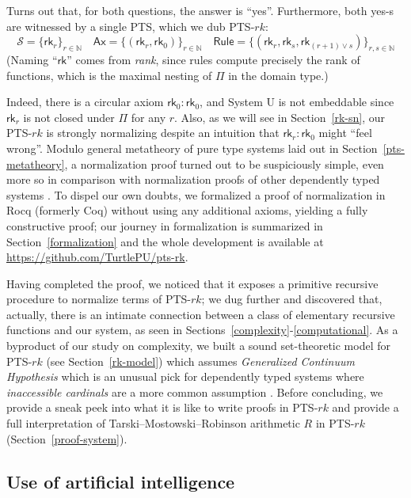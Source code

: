 \documentclass{article}
\theoremstyle{definition}
\theoremstyle{remark}
\begin{document}
Turns out that, for both questions, the answer is
``yes''. Furthermore, both yes-s are witnessed by a
single PTS, which we dub PTS-$rk$:
\[
\mathcal{S}=\{\mathsf{rk}_r\}_{r\in\mathbb{N}}
\quad
\mathsf{Ax}=
    \{(\mathsf{rk}_r,\mathsf{rk}_0)\}_{r\in\mathbb{N}}
\quad
\mathsf{Rule}=
    \{(\mathsf{rk}_r,\mathsf{rk}_s,
        \mathsf{rk}_{(r+1)\vee s})\}_{r,s\in\mathbb{N}}
\]
(Naming ``$\mathsf{rk}$'' comes from \textit{rank},
since rules compute precisely the rank of functions,
which is the maximal nesting of $\Pi$ in the domain
type.)

Indeed, there is a circular axiom
$\mathsf{rk}_0:\mathsf{rk}_0$, and System U is not
embeddable since $\mathsf{rk}_r$ is not closed
under $\Pi$ for any $r$. Also, as we will see in
Section~\ref{rk-sn}, our PTS-$rk$ is strongly
normalizing despite an intuition that
$\mathsf{rk}_r:\mathsf{rk}_0$ might ``feel wrong''.
Modulo general metatheory of pure type systems laid out
in Section~\ref{pts-metatheory}, a normalization proof
turned out to be suspiciously simple, even more so in
comparison with normalization proofs of other
dependently typed systems \cite{geuvers1991modular,
barras1999autovalidation,abel2018decidability}. To
dispel our own doubts, we formalized a proof of
normalization in Rocq (formerly Coq) without using any
additional axioms, yielding a fully constructive proof;
our journey in formalization is summarized in
Section~\ref{formalization} and the whole development
is available at
\url{https://github.com/TurtlePU/pts-rk}.

Having completed the proof, we noticed that it exposes
a primitive recursive procedure to normalize terms of
PTS-$rk$; we dug further and discovered that, actually,
there is an intimate connection between a class of
elementary recursive functions \cite{kalmar1943,
rose1984subrecursion} and our system, as seen in
Sections~\ref{complexity}-\ref{computational}. As a
byproduct of our study on complexity, we built a sound
set-theoretic model for PTS-$rk$ (see
Section~\ref{rk-model}) which assumes \emph{Generalized
Continuum Hypothesis} \cite{jech2003set,hausdorff1908,
godel1938consistency} which is an
unusual pick for dependently typed systems where
\emph{inaccessible cardinals} are a more common
assumption \cite{werner1997sets,lee2011proof}. Before
concluding, we provide a sneak peek into what it is
like to write proofs in PTS-$rk$ and provide a full
interpretation of Tarski--Mostowski--Robinson
arithmetic $R$ in PTS-$rk$
(Section~\ref{proof-system}).

\subsection{Use of artificial intelligence}
\end{document}
